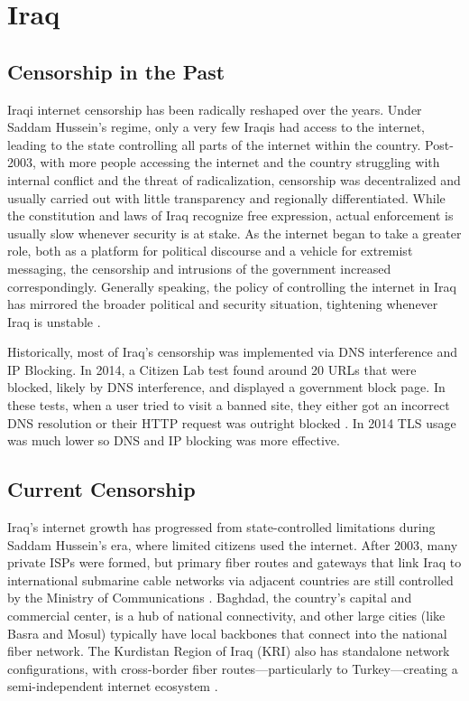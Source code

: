 \section{Iraq}

\subsection{Censorship in the Past}

Iraqi internet censorship has been radically reshaped over the years. Under Saddam Hussein's regime, only a very few Iraqis had access to the internet, leading to the state controlling all parts of the internet within the country. Post-2003, with more people accessing the internet and the country struggling with internal conflict and the threat of radicalization, censorship was decentralized and usually carried out with little transparency and regionally differentiated. While the constitution and laws of Iraq recognize free expression, actual enforcement is usually slow whenever security is at stake. As the internet began to take a greater role, both as a platform for political discourse and a vehicle for extremist messaging, the censorship and intrusions of the government increased correspondingly. Generally speaking, the policy of controlling the internet in Iraq has mirrored the broader political and security situation, tightening whenever Iraq is unstable \cite{freedomhouseIraqFreedom}.

Historically, most of Iraq's censorship was implemented via DNS interference and IP Blocking. In 2014, a Citizen Lab test found around 20 URLs that were blocked, likely by DNS interference, and displayed a government block page. In these tests, when a user tried to visit a banned site, they either got an incorrect DNS resolution or their HTTP request was outright blocked \cite{citizenlabIraqPastCensorship}. In 2014 TLS usage was much lower so DNS and IP blocking was more effective. 

\subsection{Current Censorship}

Iraq's internet growth has progressed from state-controlled limitations during Saddam Hussein's era, where limited citizens used the internet. After 2003, many private ISPs were formed, but primary fiber routes and gateways that link Iraq to international submarine cable networks via adjacent countries are still controlled by the Ministry of Communications \cite{IraqCMC}. Baghdad, the country's capital and commercial center, is a hub of national connectivity, and other large cities (like Basra and Mosul) typically have local backbones that connect into the national fiber network. The Kurdistan Region of Iraq (KRI) also has standalone network configurations, with cross-border fiber routes—particularly to Turkey—creating a semi-independent internet ecosystem \cite{freedomhouseIraqFreedom}. 

